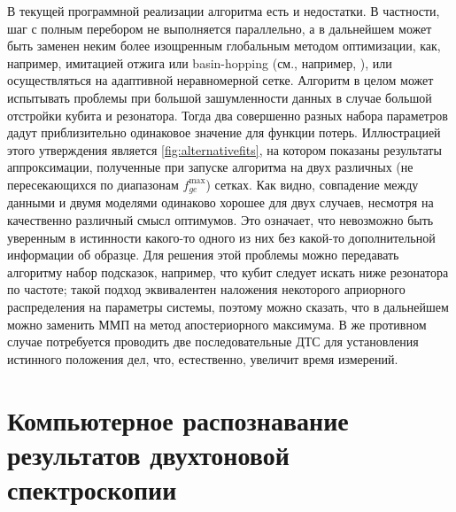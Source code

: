 \documentclass[14pt, a4paper]{extreport}
\numberwithin{equation}{section}
\begin{document}
	В текущей программной реализации алгоритма есть и недостатки. В частности, шаг с полным перебором не выполняется параллельно, а в дальнейшем может быть заменен неким более изощренным глобальным методом оптимизации, как, например, имитацией отжига или \foreignlanguage{english}{basin-hopping} (см., например, \cite{wales1997global}), или осуществляться на адаптивной неравномерной сетке. Алгоритм в целом может испытывать проблемы при большой зашумленности данных в случае большой отстройки кубита и резонатора. Тогда два совершенно разных набора параметров дадут приблизительно одинаковое значение для функции потерь. Иллюстрацией этого утверждения является \autoref{fig:alternativefits}, на котором показаны результаты аппроксимации, полученные при запуске алгоритма на двух различных (не пересекающихся по диапазонам $f_{ge}^\text{max}$) сетках. Как видно, совпадение между данными и двумя моделями одинаково хорошее для двух случаев, несмотря на качественно различный смысл оптимумов. Это означает, что невозможно быть уверенным в истинности какого-то одного из них без какой-то дополнительной информации об образце. Для решения этой проблемы можно передавать алгоритму набор подсказок, например, что кубит следует искать ниже резонатора по частоте; такой подход эквивалентен наложения некоторого априорного распределения на параметры системы, поэтому можно сказать, что в дальнейшем можно заменить ММП на метод апостериорного максимума. В же противном случае потребуется проводить две последовательные ДТС для установления истинного положения дел, что, естественно, увеличит время измерений.
		
	\section{Компьютерное распознавание результатов двухтоновой спектроскопии}
	
\end{document}
